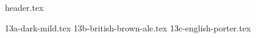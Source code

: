 \clearpage
{}
\divisorLine

{header.tex}

\begin{multicols}{2}

{13a-dark-mild.tex}
{13b-british-brown-ale.tex}
{13c-english-porter.tex}

\end{multicols}